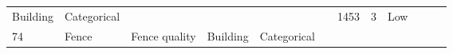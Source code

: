 \documentclass[11pt]{article}
\begin{document}
\begin{longtable}[]{@{}llllllllllll@{}}
\begin{minipage}[t]{0.04\columnwidth}
Building\strut
\end{minipage} & \begin{minipage}[t]{0.04\columnwidth}\raggedright\strut
Categorical\strut
\end{minipage} & \begin{minipage}[t]{0.04\columnwidth}\raggedright\strut
\strut
\end{minipage} & \begin{minipage}[t]{0.04\columnwidth}\raggedright\strut
\strut
\end{minipage} & \begin{minipage}[t]{0.04\columnwidth}\raggedright\strut
\strut
\end{minipage} & \begin{minipage}[t]{0.04\columnwidth}\raggedright\strut
\strut
\end{minipage} & \begin{minipage}[t]{0.04\columnwidth}\raggedright\strut
1453\strut
\end{minipage} & \begin{minipage}[t]{0.04\columnwidth}\raggedright\strut
3\strut
\end{minipage} & \begin{minipage}[t]{0.04\columnwidth}\raggedright\strut
Low\strut
\end{minipage}\tabularnewline
\begin{minipage}[t]{0.04\columnwidth}\raggedright\strut
74\strut
\end{minipage} & \begin{minipage}[t]{0.04\columnwidth}\raggedright\strut
Fence\strut
\end{minipage} & \begin{minipage}[t]{0.04\columnwidth}\raggedright\strut
Fence quality\strut
\end{minipage} & \begin{minipage}[t]{0.04\columnwidth}\raggedright\strut
Building\strut
\end{minipage} & \begin{minipage}[t]{0.04\columnwidth}\raggedright\strut
Categorical\strut
\end{minipage} & \begin{minipage}[t]{0.04\columnwidth}\raggedright\strut
\strut
\end{minipage} & \begin{minipage}[t]{0.04\columnwidth}\raggedright\strut
\strut
\end{minipage} & \begin{minipage}[t]{0.04\columnwidth}\raggedright\strut

\end{minipage}
\end{longtable}
\end{document}
